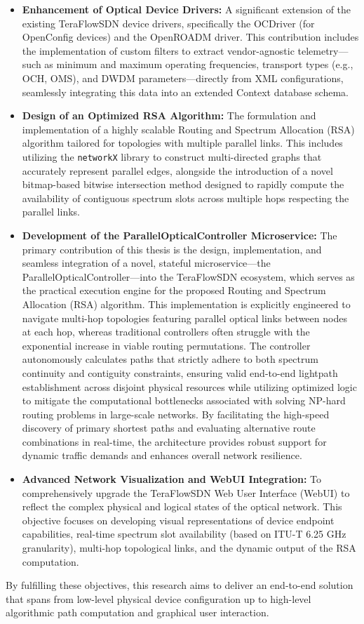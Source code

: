 \begin{itemize}
    \item \textbf{Enhancement of Optical Device Drivers:} A significant extension of the existing TeraFlowSDN device drivers, specifically the OCDriver (for OpenConfig devices) and the OpenROADM driver. This contribution includes the implementation of custom filters to extract vendor-agnostic telemetry—such as minimum and maximum operating frequencies, transport types (e.g., OCH, OMS), and DWDM parameters—directly from XML configurations, seamlessly integrating this data into an extended Context database schema.
    \item \textbf{Design of an Optimized RSA Algorithm:} The formulation and implementation of a highly scalable Routing and Spectrum Allocation (RSA) algorithm tailored for topologies with multiple parallel links. This includes utilizing the \texttt{networkX} library to construct multi-directed graphs that accurately represent parallel edges, alongside the introduction of a novel bitmap-based bitwise intersection method designed to rapidly compute the availability of contiguous spectrum slots across multiple hops respecting the parallel links.
    \item \textbf{Development of the ParallelOpticalController Microservice:} The primary contribution of this thesis is the design, implementation, and seamless integration of a novel, stateful microservice—the ParallelOpticalController—into the TeraFlowSDN ecosystem, which serves as the practical execution engine for the proposed Routing and Spectrum Allocation (RSA) algorithm. This implementation is explicitly engineered to navigate multi-hop topologies featuring parallel optical links between nodes at each hop, whereas traditional controllers often struggle with the exponential increase in viable routing permutations. The controller autonomously calculates paths that strictly adhere to both spectrum continuity and contiguity constraints, ensuring valid end-to-end lightpath establishment across disjoint physical resources while utilizing optimized logic to mitigate the computational bottlenecks associated with solving NP-hard routing problems in large-scale networks. By facilitating the high-speed discovery of primary shortest paths and evaluating alternative route combinations in real-time, the architecture provides robust support for dynamic traffic demands and enhances overall network resilience.
    \item \textbf{Advanced Network Visualization and WebUI Integration:} To comprehensively upgrade the TeraFlowSDN Web User Interface (WebUI) to reflect the complex physical and logical states of the optical network. This objective focuses on developing visual representations of device endpoint capabilities, real-time spectrum slot availability (based on ITU-T 6.25 GHz granularity), multi-hop topological links, and the dynamic output of the RSA computation.
\end{itemize}
By fulfilling these objectives, this research aims to deliver an end-to-end solution that spans from low-level physical device configuration up to high-level algorithmic path computation and graphical user interaction.
